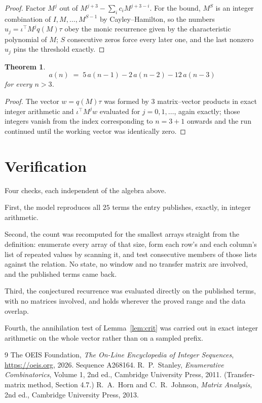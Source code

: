 \documentclass[11pt,a4paper]{article}
\theoremstyle{plain}
\newtheorem{theorem}{Theorem}
\theoremstyle{definition}
\begin{document}
\begin{proof}
Factor $M^{j}$ out of $M^{j+3}-\sum_ic_iM^{j+3-i}$. For the bound, $M^{S}$
is an integer combination of $I,M,\dots,M^{S-1}$ by Cayley--Hamilton, so the numbers
$u_j=\iota^{\!\top}M^{j}q(M)\tau$ obey the monic recurrence given by the characteristic
polynomial of $M$; $S$ consecutive zeros force every later one, and the last nonzero $u_j$
pins the threshold exactly.
\end{proof}

\begin{theorem}
\[
a(n)\;=\;5\,a(n-1) - 2\,a(n-2) - 12\,a(n-3)
\]
for every $n>3$.
\end{theorem}

\begin{proof}
The vector $w=q(M)\tau$ was formed by $3$ matrix--vector products in exact integer
arithmetic and $\iota^{\!\top}M^{j}w$ evaluated for $j=0,1,\dots$, again exactly; those
integers vanish from the index corresponding to $n=3+1$ onwards and the run continued
until the working vector was identically zero.
\end{proof}

\section{Verification}

Four checks, each independent of the algebra above.

First, the model reproduces all $25$ terms the entry publishes, exactly, in integer
arithmetic.

Second, the count was recomputed for the smallest arrays straight from the definition:
enumerate every array of that size, form each row's and each column's list of repeated values
by scanning it, and test consecutive members of those lists against the relation. No state, no
window and no transfer matrix are involved, and the published terms came back.

Third, the conjectured recurrence was evaluated directly on the published terms, with no
matrices involved, and holds wherever the proved range and the data overlap.

Fourth, the annihilation test of Lemma~\ref{lem:crit} was carried out in exact integer
arithmetic on the whole vector rather than on a sampled prefix.

\begin{thebibliography}{9}
 The OEIS Foundation, \emph{The On-Line Encyclopedia of Integer
Sequences}, \url{https://oeis.org}, 2026. Sequence A268164.
 R.~P.~Stanley, \emph{Enumerative Combinatorics}, Volume 1, 2nd ed.,
Cambridge University Press, 2011. (Transfer-matrix method, Section 4.7.)
 R.~A.~Horn and C.~R.~Johnson, \emph{Matrix Analysis}, 2nd ed., Cambridge
University Press, 2013.
\end{thebibliography}
\end{document}
